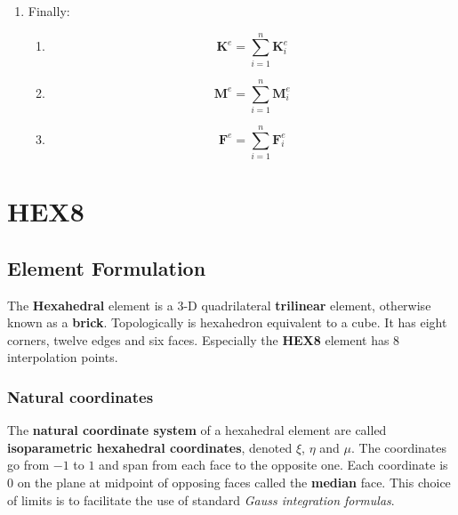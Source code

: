 \documentclass[10pt,b5paper,titlepage]{book}
\begin{document}
\begin{enumerate}
    \item Finally:
        \begin{enumerate}
            \item \begin{equation}
                    \mathbf{K}^e = \sum_{i=1}^n \mathbf{K}_i^e
                \end{equation}

            \item \begin{equation}
                    \mathbf{M}^e = \sum_{i=1}^n \mathbf{M}_i^e
                \end{equation}

            \item \begin{equation}
                    \mathbf{F}^e = \sum_{i=1}^n \mathbf{F}_i^e
                \end{equation}
        \end{enumerate}
\end{enumerate}



\newpage
\section{HEX8}

\subsection{Element Formulation}

The \textbf{Hexahedral} element is a 3-D quadrilateral \textbf{trilinear} element, otherwise known
as a \textbf{brick}. Topologically is hexahedron equivalent to a cube. It has eight
corners, twelve edges and six faces. Especially the \textbf{HEX8} element has
8 interpolation points.

\subsubsection{Natural coordinates}
The \textbf{natural coordinate system} of a hexahedral element are called
\textbf{isoparametric hexahedral coordinates}, denoted $ \xi $, $ \eta $ and $ \mu $.
The coordinates go from $ -1 $ to $ 1 $ and span from each face to the opposite one.
Each coordinate is 0 on the plane at midpoint of opposing faces called the
\textbf{median} face. This choice of limits is to facilitate the use of standard
\textit{Gauss integration formulas}.
\end{document}
